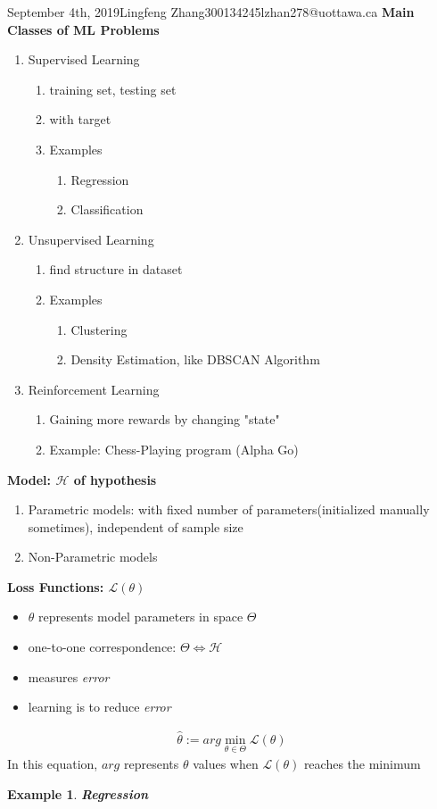 \documentclass{article}
\newtheorem{ex}{Example}
\begin{document}
\begin{lecture}{September 4th, 2019}{Lingfeng Zhang}{300134245}{lzhan278@uottawa.ca}
\textbf{Main Classes of ML Problems}
\begin{enumerate}
\item Supervised Learning
	\begin{enumerate}
	\item training set, testing set
	\item with target
	\item Examples
		\begin{enumerate}
		\item Regression
		\item Classification
		\end{enumerate}
	\end{enumerate}
\item Unsupervised Learning
	\begin{enumerate}
	\item find structure in dataset
	\item Examples
		\begin{enumerate}
		\item Clustering
		\item Density Estimation, like DBSCAN Algorithm
		\end{enumerate}
	\end{enumerate}
\item Reinforcement Learning
	\begin{enumerate}
	\item Gaining more rewards by changing "state"
	\item Example: Chess-Playing program (Alpha Go)
	\end{enumerate}
\end{enumerate}

\textbf{Model: $\mathcal{H}$ of hypothesis}
\begin{enumerate}
\item Parametric models: with fixed number of parameters(initialized manually sometimes), independent of sample size
\item Non-Parametric models
\end{enumerate}

\textbf{Loss Functions: $\mathcal{L}(\theta)$}

\begin{itemize}
\item $\theta$ represents model parameters in space $\Theta$
\item one-to-one correspondence: $\Theta\Longleftrightarrow\mathcal{H}$
\item measures \textit{error}
\item learning is to reduce \textit{error}
\end{itemize}
\begin{eqnarray}
\hat\theta:=arg\min\limits_{\theta\in\Theta}\mathcal{L}(\theta)
\end{eqnarray}
In this equation, $arg$ represents $\theta$ values when $\mathcal{L}(\theta)$ reaches the minimum
\begin{ex}
\textbf{Regression}


\end{ex}
\end{lecture}
\end{document}
